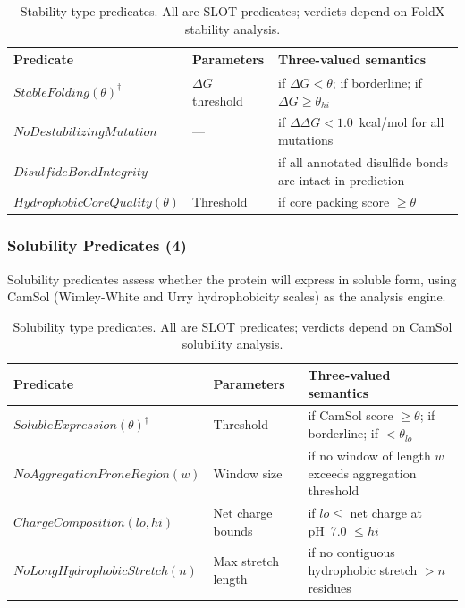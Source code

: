 \begin{table}[t]
\centering
\caption{Stability type predicates. All are SLOT predicates; verdicts
         depend on FoldX stability analysis.}
\label{tab:stab-predicates}
\begin{tabular}{llp{4.6cm}}
\toprule
\textbf{Predicate} & \textbf{Parameters} & \textbf{Three-valued semantics} \\
\midrule
$\mathit{StableFolding}(\theta)^\dagger$ & $\Delta G$ threshold &
  \PASS{} if $\Delta G < \theta$; \UNCERTAIN{} if borderline;
  \FAIL{} if $\Delta G \ge \theta_{\mathit{hi}}$ \\
$\mathit{NoDestabilizingMutation}$ & --- &
  \PASS{} if $\Delta\Delta G < 1.0$~kcal/mol for all mutations \\
$\mathit{DisulfideBondIntegrity}$ & --- &
  \PASS{} if all annotated disulfide bonds are intact in prediction \\
$\mathit{HydrophobicCoreQuality}(\theta)$ & Threshold &
  \PASS{} if core packing score $\ge \theta$ \\
\bottomrule
\end{tabular}
\end{table}

\subsubsection{Solubility Predicates (4)}

Solubility predicates assess whether the protein will express in
soluble form, using CamSol (Wimley-White and Urry hydrophobicity
scales) as the analysis engine.

\begin{table}[t]
\centering
\caption{Solubility type predicates. All are SLOT predicates; verdicts
         depend on CamSol solubility analysis.}
\label{tab:sol-predicates}
\begin{tabular}{llp{4.6cm}}
\toprule
\textbf{Predicate} & \textbf{Parameters} & \textbf{Three-valued semantics} \\
\midrule
$\mathit{SolubleExpression}(\theta)^\dagger$ & Threshold &
  \PASS{} if CamSol score $\ge \theta$; \UNCERTAIN{} if
  borderline; \FAIL{} if $< \theta_{\mathit{lo}}$ \\
$\mathit{NoAggregationProneRegion}(w)$ & Window size &
  \PASS{} if no window of length $w$ exceeds aggregation threshold \\
$\mathit{ChargeComposition}(lo,hi)$ & Net charge bounds &
  \PASS{} if $lo \le$ net charge at pH~7.0 $\le hi$ \\
$\mathit{NoLongHydrophobicStretch}(n)$ & Max stretch length &
  \PASS{} if no contiguous hydrophobic stretch $> n$ residues \\
\bottomrule
\end{tabular}
\end{table}

